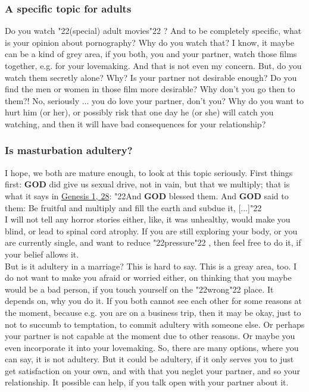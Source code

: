 \documentclass[10pt,a5paper]{article}
\newcommand{\God}[0]{\textbf{GOD}}
\newcommand{\q}[1]{\char"22{#1}\char"22 }
\begin{document}
	\subsubsection{A specific topic for adults}
		Do you watch \q{(special) adult movies}?
		And to be completely specific,
		what is your opinion about pornography?
		Why do you watch that?
		I know,
		it maybe can be a kind of grey area,
		if you both,
		you and your partner,
		watch those films together,
		e.g. for your lovemaking.
		And that is not even my concern.
		But,
		do you watch them secretly alone?
		Why?
		Is your partner not desirable enough?
		Do you find the men or women in those film more desirable?
		Why don't you go then to them?!
		No,
		seriously ...
		you do love your partner, don't you?
		Why do you want to hurt him (or her),
		or possibly risk that one day he (or she) will catch you watching,
		and then it will have bad consequences for your relationship?
		
	\subsubsection{Is masturbation adultery?}
		I hope,
		we both are mature enough,
		to look at this topic seriously.
		First things first:
		{\God} did give us sexual drive,
		not in vain,
		but that we multiply;
		that is what it says in \href{https://www.die-bibel.de/bibeln/online-bibeln/lesen/ESV/GEN.1/Genesis-1}{Genesis 1, 28}:
		\q{And {\God} blessed them.
		And {\God} said to them:
		Be fruitful and multiply and fill the earth and subdue it, [...]}
		\\
		I will not tell any horror stories either,
		like,
		it was unhealthy,
		would make you blind,
		or lead to spinal cord atrophy.
		If you are still exploring your body,
		or you are currently single,
		and want to reduce \q{pressure},
		then feel free to do it,
		if your belief allows it.
		\\
		But is it adultery in a marriage?
		This is hard to say.
		This is a greay area, too.
		I do not want to make you afraid or worried either,
		on thinking that you maybe would be a bad person,
		if you touch yourself on the \q{wrong} place.
		It depends on,
		why you do it.
		If you both cannot see each other for some reasons at the moment,
		because e.g. you are on a business trip,
		then it may be okay,
		just to not to succumb to temptation,
		to commit adultery with someone else.
		Or perhaps your partner is not capable at the moment due to other reasons.
		Or maybe you even incorporate it into your lovemaking.
		So,
		there are many options,
		where you can say,
		it is not adultery.
		But it could be adultery,
		if it only serves you to just get satisfaction on your own,
		and with that you neglet your partner,
		and so your relationship.
		It possible can help,
		if you talk open with your partner about it.
		
\end{document}
